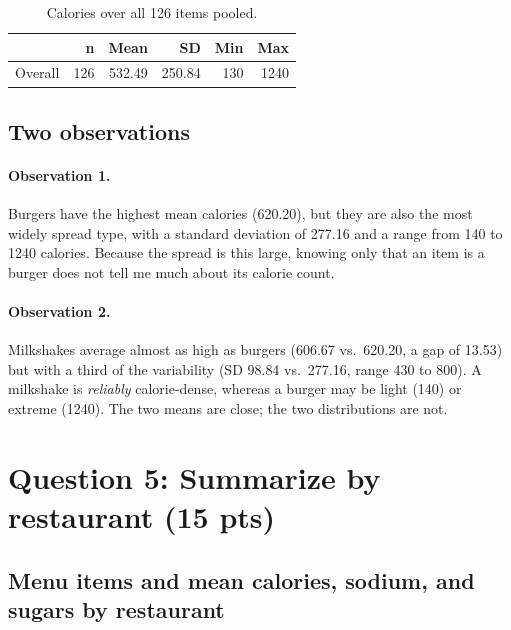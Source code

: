 \documentclass[11pt]{article}
\newcommand{\question}[2]{%
  \section*{\color{headblue}#1 \hfill \normalfont\small(#2)}}
\begin{document}
\begin{table}[H]\centering\small
\begin{tabular}{lrrrrr}
\toprule
 & n & Mean & SD & Min & Max \\
\midrule
Overall & 126 & 532.49 & 250.84 & 130 & 1240 \\
\bottomrule
\end{tabular}
\caption{Calories over all 126 items pooled.}
\end{table}

\subsection*{Two observations}

\paragraph{Observation 1.} Burgers have the highest mean calories (620.20), but they are
also the most widely spread type, with a standard deviation of 277.16 and a range from 140
to 1240 calories. Because the spread is this large, knowing only that an item is a burger
does not tell me much about its calorie count.

\paragraph{Observation 2.} Milkshakes average almost as high as burgers (606.67 vs.\ 620.20,
a gap of 13.53) but with a third of the variability (SD 98.84 vs.\ 277.16, range 430 to 800).
A milkshake is \emph{reliably} calorie-dense, whereas a burger may be light (140) or
extreme (1240). The two means are close; the two distributions are not.

\clearpage
\question{Question 5: Summarize by restaurant}{15 pts}

\subsection*{Menu items and mean calories, sodium, and sugars by restaurant}
\end{document}
